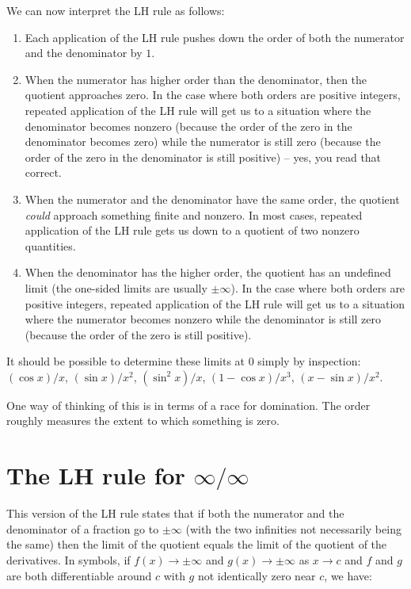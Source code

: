 \documentclass{amsart}
\begin{document}
We can now interpret the LH rule as follows:

\begin{enumerate}
\item Each application of the LH rule pushes down the order of both
  the numerator and the denominator by $1$.
\item When the numerator has higher order than the denominator, then
  the quotient approaches zero. In the case where both orders are
  positive integers, repeated application of the LH rule will get us
  to a situation where the denominator becomes nonzero (because the
  order of the zero in the denominator becomes zero) while the
  numerator is still zero (because the order of the zero in the
  denominator is still positive) -- yes, you read that correct.
\item When the numerator and the denominator have the same order, the
  quotient {\em could} approach something finite and nonzero. In most
  cases, repeated application of the LH rule gets us down to a
  quotient of two nonzero quantities.
\item When the denominator has the higher order, the quotient has an
  undefined limit (the one-sided limits are usually $\pm \infty$). In
  the case where both orders are positive integers, repeated
  application of the LH rule will get us to a situation where the
  numerator becomes nonzero while the denominator is still zero
  (because the order of the zero is still positive).
\end{enumerate}

It should be possible to determine these limits at $0$ simply by
inspection: $(\cos x)/x$, $(\sin x)/x^2$, $(\sin^2 x)/x$, $(1 - \cos
x)/x^3$, $(x - \sin x)/x^2$.

One way of thinking of this is in terms of a race for domination. The
order roughly measures the extent to which something is zero.

\section{The LH rule for $\infty/\infty$}
This version of the LH rule states that if both the numerator and the
denominator of a fraction go to $\pm \infty$ (with the two infinities
not necessarily being the same) then the limit of the quotient equals
the limit of the quotient of the derivatives. In symbols, if $f(x) \to
\pm \infty$ and $g(x) \to \pm \infty$ as $x \to c$ and $f$ and $g$ are
both differentiable around $c$ with $g$ not identically zero near $c$,
we have:
\end{document}
